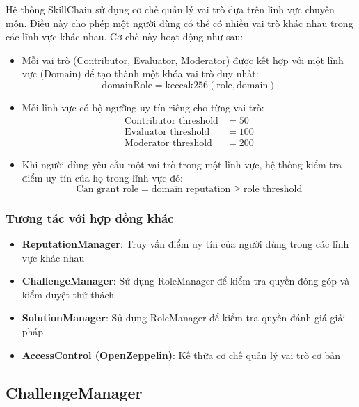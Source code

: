 Hệ thống SkillChain sử dụng cơ chế quản lý vai trò dựa trên lĩnh vực chuyên môn. Điều này cho phép một người dùng có thể có nhiều vai trò khác nhau trong các lĩnh vực khác nhau. Cơ chế này hoạt động như sau:

\begin{itemize}
  \item Mỗi vai trò (Contributor, Evaluator, Moderator) được kết hợp với một lĩnh vực (Domain) để tạo thành một khóa vai trò duy nhất:
    \[ \text{domainRole} = \text{keccak256}(\text{role}, \text{domain}) \]
  
  \item Mỗi lĩnh vực có bộ ngưỡng uy tín riêng cho từng vai trò:
    \begin{align}
    \text{Contributor threshold} &= 50 \\
    \text{Evaluator threshold} &= 100 \\
    \text{Moderator threshold} &= 200
    \end{align}
  
  \item Khi người dùng yêu cầu một vai trò trong một lĩnh vực, hệ thống kiểm tra điểm uy tín của họ trong lĩnh vực đó:
    \[ \text{Can grant role} = \text{domain\_reputation} \geq \text{role\_threshold} \]
\end{itemize}

\subsubsection{Tương tác với hợp đồng khác}

\begin{itemize}
  \item \textbf{ReputationManager}: Truy vấn điểm uy tín của người dùng trong các lĩnh vực khác nhau
  \item \textbf{ChallengeManager}: Sử dụng RoleManager để kiểm tra quyền đóng góp và kiểm duyệt thử thách
  \item \textbf{SolutionManager}: Sử dụng RoleManager để kiểm tra quyền đánh giá giải pháp
  \item \textbf{AccessControl (OpenZeppelin)}: Kế thừa cơ chế quản lý vai trò cơ bản
\end{itemize}



\subsection{ChallengeManager}

